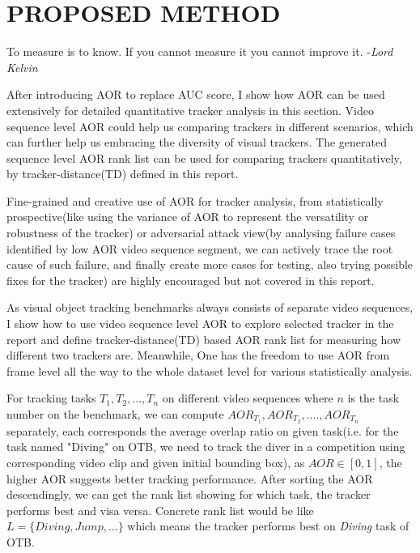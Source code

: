 \documentclass{article}
\begin{document}
\section{PROPOSED METHOD}
\label{sec:method}

\begin{displayquote}
To measure is to know. If you cannot measure it you cannot improve it. -\emph{Lord Kelvin}
\end{displayquote}

After introducing AOR to replace AUC score, I show how AOR can be used extensively for detailed quantitative tracker analysis in this section. Video sequence level AOR could help us comparing trackers in different scenarios, which can further help us embracing the diversity of visual trackers. The generated sequence level AOR rank list can be used for comparing trackers quantitatively, by tracker-distance(TD) defined in this report.

Fine-grained and creative use of AOR for tracker analysis, from statistically prospective(like using the variance of AOR to represent the versatility or robustness of the tracker) or adversarial attack view(by analysing failure cases identified by low AOR video sequence segment, we can actively trace the root cause of such failure, and finally create more cases for testing, also trying possible fixes for the tracker) are highly encouraged but not covered in this report.

As visual object tracking benchmarks always consists of separate video sequences, I show how to use video sequence level AOR to explore selected tracker in the report and define tracker-distance(TD) based AOR rank list for measuring how different two trackers are. Meanwhile, One has the freedom to use AOR from frame level all the way to the whole dataset level for various statistically analysis.

For tracking tasks $T_1, T_2, ..., T_n$ on different video sequences where $n$ is the task number on the benchmark, we can compute $AOR_{T_1}, AOR_{T_2}, ...., AOR_{T_n}$ separately, each corresponds the average overlap ratio on given task(i.e. for the task named "Diving" on OTB\cite{otb}, we need to track the diver in a competition using corresponding video clip and given initial bounding box), as $\textit{AOR} \in [0, 1]$, the higher AOR suggests better tracking performance. After sorting the AOR descendingly, we can get the rank list showing  for which task, the tracker performs best and visa versa. Concrete rank list would be like $L = \{\textit{Diving}, \textit{Jump}, ...\}$ which means the tracker performs best on \textit{Diving} task of OTB\cite{otb}.
\end{document}
